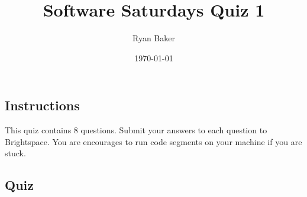 \documentclass{article}
\title{Software Saturdays Quiz 1}
\author{Ryan Baker}
\date{\today}
\begin{document}
\maketitle

\subsection*{Instructions}

\noindent
This quiz contains 8 questions. Submit your answers to each question to Brightspace. You are encourages to run code segments on your machine if you are stuck.

\subsection*{Quiz}
\end{document}
